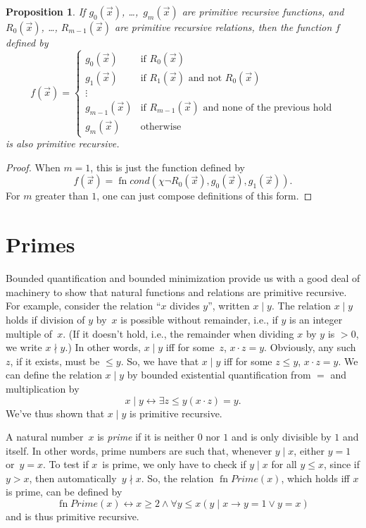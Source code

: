 \documentclass[10pt,a4paper]{article}
\theoremstyle{plain}
\newtheorem{prop}[thm]{Proposition}
\theoremstyle{definition}
\theoremstyle{remark}
\newcommand*{\olfileid}[3]{}
\newcommand*{\olsection}[1]{\section*{#1}}
\providecommand{\lif}{\mathbin{\rightarrow}}
\providecommand{\Char}{\chi}
\providecommand{\bforall}{\forall}
\providecommand{\bexists}{\exists}
\providecommand{\defiff}{\mathrel{\leftrightarrow}}
\providecommand{\fn}{\operatorname{fn}}
\begin{document}
\begin{prop}
If $g_0(\vec x)$, \dots,~$g_m(\vec x)$ are primitive recursive functions, and $R_0(\vec
x)$, \dots, $R_{m-1}(\vec x)$ are primitive recursive relations, then
the function $f$ defined by
\[
f(\vec x) = \begin{cases}
    g_0(\vec x) & \text{if $R_0(\vec{x})$} \\
    g_1(\vec x) & \text{if $R_1(\vec{x})$ and not $R_0(\vec{x})$} \\
    \vdots & \\
    g_{m-1}(\vec x) & \text{if $R_{m-1}(\vec{x})$ and none of the
      previous hold}
    \\
    g_m(\vec x) & \mbox{otherwise}
\end{cases}
\]
is also primitive recursive.
\end{prop}

\begin{proof}
  When $m = 1$, this is just the function defined by
  \[
  f(\vec x) = \fn{cond}(\Char{\lnot R_0}(\vec x),g_0(\vec x),g_1(\vec
  x)).
  \]
  For $m$ greater than $1$, one can just compose definitions of this
  form.
\end{proof}




\olfileid{cmp}{rec}{pri}
\olsection{Primes}

Bounded quantification and bounded minimization provide us with a good
deal of machinery to show that natural functions and relations are
primitive recursive. For example, consider the relation ``$x$
divides $y$'', written $x \mid y$.  The relation $x \mid y$ holds if
division of $y$ by~$x$ is possible without remainder, i.e., if $y$ is
an integer multiple of~$x$.  (If it doesn't hold, i.e., the remainder
when dividing $x$ by $y$ is $> 0$, we write $x \nmid y$.) In other
words, $x \mid y$ iff for some~$z$, $x \cdot z = y$.  Obviously, any
such $z$, if it exists, must be $\leq y$. So, we have that $x \mid y$
iff for some $z \le y$, $x \cdot z = y$.  We can define the relation
$x \mid y$ by bounded existential quantification from $=$ and
multiplication by
\[
x \mid y \defiff \bexists{z \leq y}{(x \cdot z) = y}.
\]
We've thus shown that $x \mid y$ is primitive recursive.

A natural number~$x$ is \emph{prime} if it is neither $0$ nor $1$ and
is only divisible by $1$ and itself. In other words, prime numbers are
such that, whenever $y \mid x$, either $y = 1$ or~$y=x$.  To test if
$x$~is prime, we only have to check if $y \mid x$ for all $y \le x$,
since if $y > x$, then automatically~$y \nmid x$.  So, the relation
$\fn{Prime}(x)$, which holds iff $x$ is prime, can be defined by
\[
\fn{Prime}(x) \defiff x \geq 2 \land \bforall{y \leq x}{(y \mid x \lif y
  = 1 \lor y = x)}
\]
and is thus primitive recursive.
\end{document}
